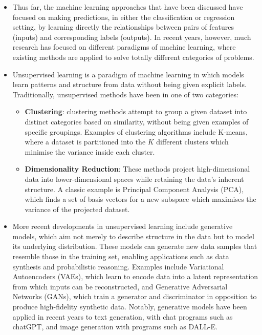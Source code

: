 \documentclass{report}
\begin{document}
\begin{itemize}
\item Thus far, the machine learning approaches that have been discussed have focused on making predictions, in either the classification or regression setting, by learning directly the relationships between pairs of features (inputs) and corresponding labels (outputs). In recent years, however, much research has focused on different paradigms of machine learning, where existing methods are applied to solve totally different categories of problems.

\item Unsupervised learning is a paradigm of machine learning in which models learn patterns and structure from data without being given explicit labels\cite{bishop2006pattern}. Traditionally, unsupervised methods have been in one of two categories:

\begin{itemize}
\item \textbf{Clustering}: clustering methods attempt to group a given dataset into distinct categories based on similarity, without being given examples of specific groupings. Examples of clustering algorithms include K-means, where a dataset is partitioned into the $K$ different clusters which minimise the variance inside each cluster.

\item \textbf{Dimensionality Reduction}: These methods project high-dimensional data into lower-dimensional spaces while retaining the data's inherent structure. A classic example is Principal Component Analysis (PCA), which finds a set of basis vectors for a new subspace which maximises the variance of the projected dataset.
\end{itemize}

\item More recent developments in unsupervised learning include generative models, which aim not merely to describe structure in the data but to model its underlying distribution\cite{GM2020100285}. These models can generate new data samples that resemble those in the training set, enabling applications such as data synthesis and probabilistic reasoning. Examples include Variational Autoencoders (VAEs), which learn to encode data into a latent representation from which inputs can be reconstructed, and Generative Adversarial Networks (GANs), which train a generator and discriminator in opposition to produce high-fidelity synthetic data. Notably, generative models have been applied in recent years to text generation, with chat programs such as chatGPT, and image generation with programs such as DALL-E.


\end{itemize}
\end{document}
